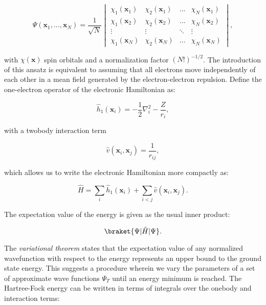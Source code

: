 \begin{equation}
\Psi(\bm{x}_1,\dots,\bm{x}_N)
= \frac{1}{\sqrt{N}}
\begin{vmatrix}
    \chi_{1}(\bm{x}_1) & \chi_{2}(\bm{x}_1)
    & \dots & \chi_{N}(\bm{x}_1) \\
    \chi_{1}(\bm{x}_2)  & \chi_{2}(\bm{x}_2)
    & \dots & \chi_{N}(\bm{x}_2) \\
    \vdots & \vdots & \ddots & \vdots \\
    \chi_{1}(\bm{x}_N) & \chi_{2}(\bm{x}_N)
    & \dots & \chi_{N}(\bm{x}_N)
\end{vmatrix} ,
\end{equation}

with $\chi(\bm{x})$ spin orbitals and a normalization factor
$(N!)^{-1/2}$. The introduction of this ansatz is equivalent to assuming that
all electrons move independently of each other
in a mean field generated by the electron-electron repulsion.
Define the one-electron operator of the electronic Hamiltonian as:

\begin{equation}
 \hat{h}_1(\bm{x}_i) = -\frac{1}{2} \nabla_i^2
    -\frac{Z}{r_i} ,
\end{equation}

with a twobody interaction term

\begin{equation}
 \hat{v}(\bm{x}_i, \bm{x}_j) = \frac{1}{r_{ij}} ,
\end{equation}

which allows us to write the electronic Hamiltonian more compactly as:

\begin{equation}
 \hat{H} = \sum_i \hat{h}_1(\bm{x}_i)
    + \sum_{i < j} \hat{v}(\bm{x}_i, \bm{x}_j) .
\end{equation}

The expectation value of the energy is given as the usual inner product:

\begin{equation}
 \braket{\Psi | \hat{H} | \Psi} .
\end{equation}

The \textit{variational theorem} states that the expectation
value of any normalized wavefunction with respect to the energy
represents an upper bound to the ground state energy.
This suggests a procedure wherein we vary the parameters
of a set of approximate wave functions $\Psi_T$
until an energy minimum is reached.
The Hartree-Fock energy can be written in terms of integrals
over the onebody and interaction terms:

